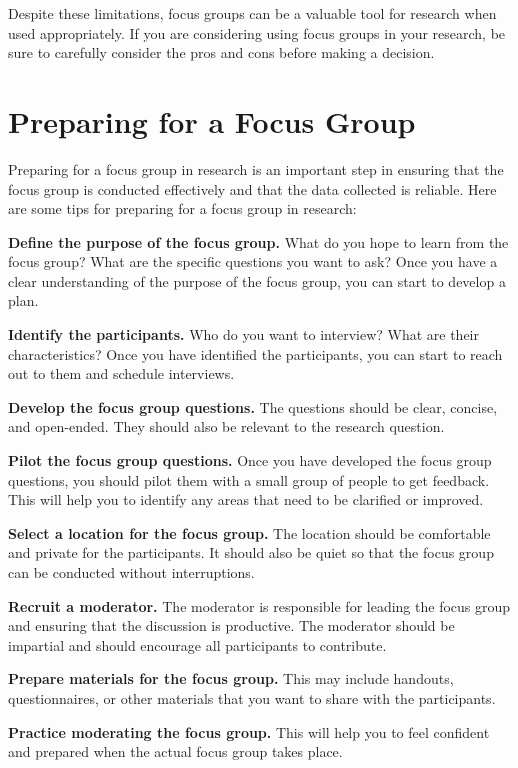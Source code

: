 \documentclass[
  b5paper]{book}
\begin{document}
Despite these limitations, focus groups can be a valuable tool for research when used appropriately. If you are considering using focus groups in your research, be sure to carefully consider the pros and cons before making a decision.

\hypertarget{preparing-for-a-focus-group}{%
\section{Preparing for a Focus Group}\label{preparing-for-a-focus-group}}

Preparing for a focus group in research is an important step in ensuring that the focus group is conducted effectively and that the data collected is reliable. Here are some tips for preparing for a focus group in research:

\textbf{Define the purpose of the focus group.} What do you hope to learn from the focus group? What are the specific questions you want to ask? Once you have a clear understanding of the purpose of the focus group, you can start to develop a plan.

\textbf{Identify the participants.} Who do you want to interview? What are their characteristics? Once you have identified the participants, you can start to reach out to them and schedule interviews.

\textbf{Develop the focus group questions.} The questions should be clear, concise, and open-ended. They should also be relevant to the research question.

\textbf{Pilot the focus group questions.} Once you have developed the focus group questions, you should pilot them with a small group of people to get feedback. This will help you to identify any areas that need to be clarified or improved.

\textbf{Select a location for the focus group.} The location should be comfortable and private for the participants. It should also be quiet so that the focus group can be conducted without interruptions.

\textbf{Recruit a moderator.} The moderator is responsible for leading the focus group and ensuring that the discussion is productive. The moderator should be impartial and should encourage all participants to contribute.

\textbf{Prepare materials for the focus group.} This may include handouts, questionnaires, or other materials that you want to share with the participants.

\textbf{Practice moderating the focus group.} This will help you to feel confident and prepared when the actual focus group takes place.
\end{document}
